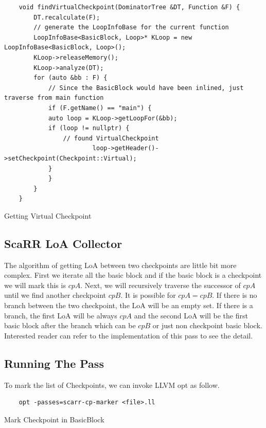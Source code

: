 \begin{listing}
\begin{verbatim}
    void findVirtualCheckpoint(DominatorTree &DT, Function &F) {
        DT.recalculate(F);
        // generate the LoopInfoBase for the current function
        LoopInfoBase<BasicBlock, Loop>* KLoop = new LoopInfoBase<BasicBlock, Loop>();
        KLoop->releaseMemory();
        KLoop->analyze(DT);
        for (auto &bb : F) {
            // Since the BasicBlock would have been inlined, just traverse from main function
            if (F.getName() == "main") {
            auto loop = KLoop->getLoopFor(&bb);
            if (loop != nullptr) {
                // found VirtualCheckpoint
                        loop->getHeader()->setCheckpoint(Checkpoint::Virtual);
            }
            }
        }
    }
\end{verbatim}
\caption{Getting Virtual Checkpoint}    
\label{listing:4-3}
\end{listing}

\subsection{ScaRR LoA Collector}

The algorithm of getting LoA between two checkpoints are little bit more complex. First we iterate all the basic block and if the basic block is a checkpoint we will mark this is $cpA$. Next, we will recursively traverse the successor of $cpA$ until we find another checkpoint $cpB$. It is possible for $cpA = cpB$. If there is no branch between the two checkpoint, the LoA will be an empty set. If there is a branch, the first LoA will be always $cpA$ and the second LoA will be the first basic block after the branch which can be $cpB$ or just non checkpoint  basic block. Interested reader can refer to the implementation of this pass to see the detail.

\subsection{Running The Pass}

To mark the list of Checkpoints, we can invoke LLVM opt as follow.

\begin{listing}
\begin{verbatim}
    opt -passes=scarr-cp-marker <file>.ll
\end{verbatim}
\caption{Mark Checkpoint in BasicBlock}    
\label{listing:4-4}
\end{listing}


